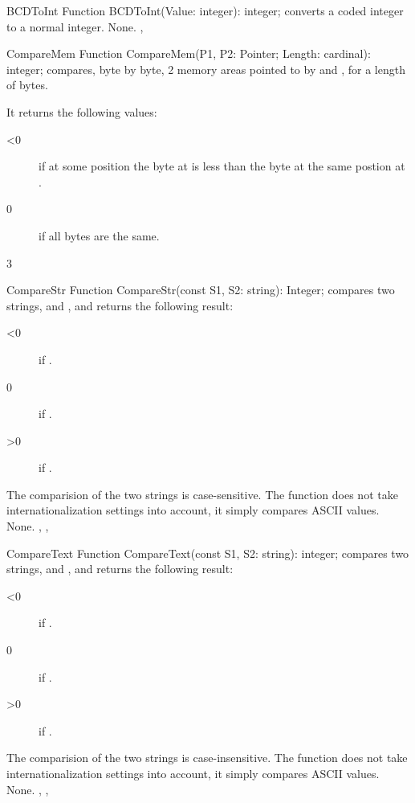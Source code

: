 

\begin{function}{BCDToInt}
\Declaration
Function BCDToInt(Value: integer): integer;
\Description
{} converts a  coded integer to a normal integer.
\Errors
None.
\SeeAlso
{}, 
\end{function}




\begin{function}{CompareMem}
\Declaration
Function CompareMem(P1, P2: Pointer; Length: cardinal): integer;
\Description
{} compares, byte by byte,  2 memory areas pointed
to by  and , for a length of  bytes.

It returns the following values:
\begin{description}
\item[<0] if at some position the byte at  is less than the byte at the
same postion at .
\item[0] if all  bytes are the same.
\item[3]
\end{description}
\Errors
\SeeAlso
\end{function}


\begin{function}{CompareStr}
\Declaration
Function CompareStr(const S1, S2: string): Integer;
\Description
{} compares two strings,  and ,
and returns the following
result:
\begin{description}
\item[<0]  if .
\item[0]  if .
\item[>0]  if .
\end{description}
The comparision of the two strings is case-sensitive.
The function does not take internationalization settings into account, it
simply compares ASCII values.
\Errors
None.
\SeeAlso
{}, , 
\end{function}



\begin{function}{CompareText}
\Declaration
Function CompareText(const S1, S2: string): integer;
\Description
{} compares two strings,  and ,
and returns the following
result:
\begin{description}
\item[<0]  if .
\item[0]  if .
\item[>0]  if .
\end{description}
The comparision of the two strings is case-insensitive.
The function does not take internationalization settings into account, it
simply compares ASCII values.
\Errors
None.
\SeeAlso
{}, , 
\end{function}

